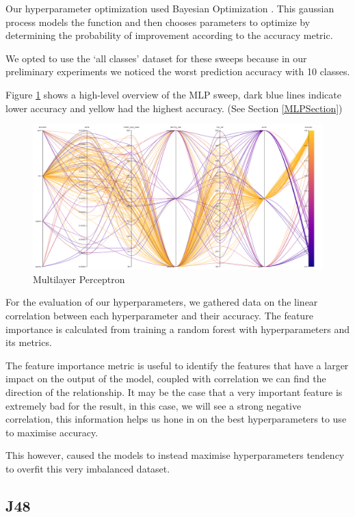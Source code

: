 \documentclass[11pt]{article}
\begin{document}
Our hyperparameter optimization used Bayesian Optimization \cite{Configuration}. This gaussian process models the function and then chooses parameters to optimize by determining the probability of improvement according to the accuracy metric. 
\par
We opted to use the ‘all classes’ dataset for these sweeps because in our preliminary experiments we noticed the worst prediction accuracy with 10 classes.

Figure \ref{MLPLineGraph} shows a high-level overview of the MLP sweep, dark blue lines indicate lower accuracy and yellow had the highest accuracy. (See Section \ref{MLPSection})

\begin{figure}[h]
  \caption {Multilayer Perceptron} \label{MLPLineGraph}
  \centering 
  \includegraphics[width = \textwidth, height = 0.3\textheight, keepaspectratio]{Images/MLP ParallelCoordGraph.png}
\end{figure}


For the evaluation of our hyperparameters, we gathered data on the linear correlation between each hyperparameter and their accuracy. The feature importance is calculated from training a random forest with hyperparameters and its metrics. \cite{ParameterImportance}
\par
The feature importance metric is useful to identify the features that have a larger impact on the output of the model, coupled with correlation we can find the direction of the relationship. It may be the case that a very important feature is extremely bad for the result, in this case, we will see a strong negative correlation, this information helps us hone in on the best hyperparameters to use to maximise accuracy.
\par
This however, caused the models to instead maximise hyperparameters tendency to overfit this very imbalanced dataset.
\newpage
\subsection{J48}
\end{document}
